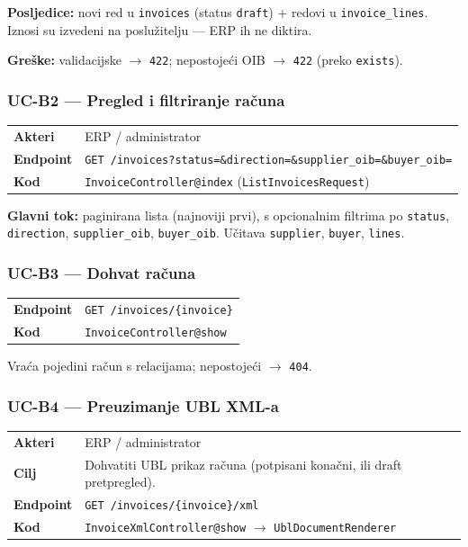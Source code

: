 \documentclass[11pt,a4paper]{article}
\begin{document}
\textbf{Posljedice:} novi red u \texttt{invoices} (status \texttt{draft}) + redovi u \texttt{invoice\_lines}.
Iznosi su izvedeni na poslužitelju — ERP ih ne diktira.

\textbf{Greške:} validacijske $\rightarrow$ \texttt{422}; nepostojeći OIB $\rightarrow$ \texttt{422} (preko \texttt{exists}).

\subsubsection{UC-B2 — Pregled i filtriranje računa}

\begin{tabularx}{\textwidth}{@{}lY@{}}
\toprule
\textbf{Akteri} & ERP / administrator \\
\textbf{Endpoint} & \texttt{GET /invoices?status=\&direction=\&supplier\_oib=\&buyer\_oib=} \\
\textbf{Kod} & \texttt{InvoiceController@index} (\texttt{ListInvoicesRequest}) \\
\bottomrule
\end{tabularx}

\textbf{Glavni tok:} paginirana lista (najnoviji prvi), s opcionalnim filtrima po \texttt{status},
\texttt{direction}, \texttt{supplier\_oib}, \texttt{buyer\_oib}. Učitava \texttt{supplier}, \texttt{buyer}, \texttt{lines}.

\subsubsection{UC-B3 — Dohvat računa}

\begin{tabularx}{\textwidth}{@{}lY@{}}
\toprule
\textbf{Endpoint} & \texttt{GET /invoices/\{invoice\}} \\
\textbf{Kod} & \texttt{InvoiceController@show} \\
\bottomrule
\end{tabularx}

Vraća pojedini račun s relacijama; nepostojeći $\rightarrow$ \texttt{404}.

\subsubsection{UC-B4 — Preuzimanje UBL XML-a}

\begin{tabularx}{\textwidth}{@{}lY@{}}
\toprule
\textbf{Akteri} & ERP / administrator \\
\textbf{Cilj} & Dohvatiti UBL prikaz računa (potpisani konačni, ili draft pretpregled). \\
\textbf{Endpoint} & \texttt{GET /invoices/\{invoice\}/xml} \\
\textbf{Kod} & \texttt{InvoiceXmlController@show} $\rightarrow$ \texttt{UblDocumentRenderer} \\
\bottomrule
\end{tabularx}
\end{document}
